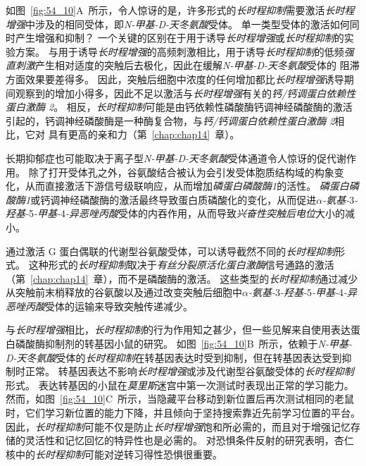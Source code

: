 如图~\ref{fig:54_10}A~所示，令人惊讶的是，许多形式的\textit{长时程抑制}需要激活\textit{长时程增强}中涉及的相同受体，即\textit{N-甲基-D-天冬氨酸}受体。
单一类型受体的激活如何同时产生增强和抑制？
一个关键的区别在于用于诱导\textit{长时程增强}或\textit{长时程抑制}的实验方案。
与用于诱导\textit{长时程增强}的高频刺激相比，用于诱导\textit{长时程抑制}的低频\textit{强直刺激}产生相对适度的突触后去极化，因此在缓解\textit{N-甲基-D-天冬氨酸}受体的  阻滞方面效果要差得多。
因此，突触后细胞中浓度的任何增加都比\textit{长时程增强}诱导期间观察到的增加小得多，因此不足以激活与\textit{长时程增强}有关的\textit{钙/钙调蛋白依赖性蛋白激酶 2}。
相反，\textit{长时程抑制}可能是由钙依赖性磷酸酶钙调神经磷酸酶的激活引起的，钙调神经磷酸酶是一种酶复合物，与\textit{钙/钙调蛋白依赖性蛋白激酶 2}相比，它对  具有更高的亲和力（第~\ref{chap:chap14}~章）。


长期抑郁症也可能取决于离子型\textit{N-甲基-D-天冬氨酸}受体通道令人惊讶的促代谢作用。
除了打开受体孔之外，谷氨酸结合被认为会引发受体胞质结构域的构象变化，从而直接激活下游信号级联响应，从而增加\textit{磷蛋白磷酸酶1}的活性。
\textit{磷蛋白磷酸酶1}或钙调神经磷酸酶的激活最终导致蛋白质磷酸化的变化，从而促进\textit{$\alpha$-氨基-}3\textit{-羟基-}5\textit{-甲基-}4\textit{-异恶唑丙酸}受体的内吞作用，从而导致\textit{兴奋性突触后电位}大小的减小。


通过激活 G 蛋白偶联的代谢型谷氨酸受体，可以诱导截然不同的\textit{长时程抑制}形式。
这种形式的\textit{长时程抑制}取决于\textit{\textit{有丝分裂原活化蛋白激酶}}信号通路的激活（第~\ref{chap:chap14}~章），而不是磷酸酶的激活。
这些类型的\textit{长时程抑制}通过减少从突触前末梢释放的谷氨酸以及通过改变突触后细胞中\textit{$\alpha$-氨基-}3\textit{-羟基-}5\textit{-甲基-}4\textit{-异恶唑丙酸}受体的运输来导致突触传递减少。


与\textit{长时程增强}相比，\textit{长时程抑制}的行为作用知之甚少，但一些见解来自使用表达蛋白磷酸酶抑制剂的转基因小鼠的研究。
如图~\ref{fig:54_10}B~所示，依赖于\textit{N-甲基-D-天冬氨酸}受体的\textit{长时程抑制}在转基因表达时受到抑制，但在转基因表达受到抑制时正常。
转基因表达不影响\textit{长时程增强}或涉及代谢型谷氨酸受体的\textit{长时程抑制}形式。
表达转基因的小鼠在\textit{莫里斯}迷宫中第一次测试时表现出正常的学习能力。
然而，如图~\ref{fig:54_10}C~所示，当隐藏平台移动到新位置后再次测试相同的老鼠时，它们学习新位置的能力下降，并且倾向于坚持搜索靠近先前学习位置的平台。
因此，\textit{长时程抑制}可能不仅是防止\textit{长时程增强}饱和所必需的，而且对于增强记忆存储的灵活性和记忆回忆的特异性也是必需的。
对恐惧条件反射的研究表明，杏仁核中的\textit{长时程抑制}可能对逆转习得性恐惧很重要。



